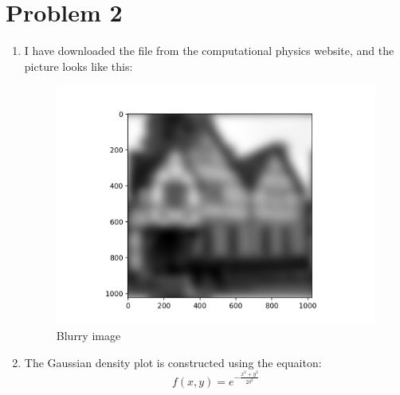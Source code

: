\documentclass[12pt,letterpaper]{article}
\begin{document}
\section*{Problem 2}
\begin{enumerate}
    \item
    I have downloaded the file from the computational physics website, and the picture looks like this:
    \begin{figure}[h]
    \centering
    \includegraphics[width=1.\linewidth]{q2a.png}
    \caption{Blurry image}
    \end{figure}
    


    
    \item 
    The Gaussian density plot is constructed using the equaiton:
    \begin{equation}
        f(x,y)=e^{-\frac{x^2+y^2}{2\delta^2}}
    \end{equation}
    

\end{enumerate}
\end{document}

